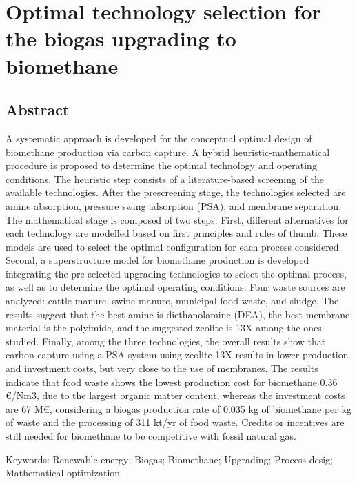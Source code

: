 \chapter{Optimal technology selection for the biogas upgrading to biomethane}\label{ch:BiogasUpgrading}
\begin{refsection}[referencesCh7]
\section*{Abstract}
A systematic approach is developed for the conceptual optimal design of biomethane production via carbon capture. A hybrid heuristic-mathematical procedure is proposed to determine the optimal technology and operating conditions. The heuristic step consists of a literature-based screening of the available technologies. After the prescreening stage, the technologies selected are amine absorption, pressure swing adsorption (PSA), and membrane separation. The mathematical stage is composed of two steps. First, different alternatives for each technology are modelled based on first principles and rules of thumb. These models are used to select the optimal configuration for each process considered. Second, a superstructure model for biomethane production is developed integrating the pre-selected upgrading technologies to select the optimal process, as well as to determine the optimal operating conditions. Four waste sources are analyzed: cattle manure, swine manure, municipal food waste, and sludge. The results suggest that the best amine is diethanolamine (DEA), the best membrane material is the polyimide, and the suggested zeolite is 13X among the ones studied. Finally, among the three technologies, the overall results show that carbon capture using a PSA system using zeolite 13X results in lower production and investment costs, but very close to the use of membranes. The results indicate that food waste shows the lowest production cost for biomethane 0.36 €/Nm3, due to the largest organic matter content, whereas the investment costs are 67 M€, considering a biogas production rate of 0.035 kg of biomethane per kg of waste and the processing of 311 kt/yr of food waste. Credits or incentives are still needed for biomethane to be competitive with fossil natural gas.

\bigskip
Keywords: Renewable energy; Biogas; Biomethane; Upgrading; Process desig; Mathematical optimization
\newpage


\end{refsection}
